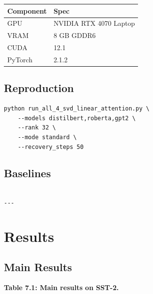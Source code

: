 \begin{table}[H]
\centering
\small
\begin{tabular}{ll}
\toprule
\textbf{Component} & \textbf{Spec} \\
\midrule
GPU & NVIDIA RTX 4070 Laptop \\
VRAM & 8 GB GDDR6 \\
CUDA & 12.1 \\
PyTorch & 2.1.2 \\
\bottomrule
\end{tabular}
\end{table}

\subsection{Reproduction}

\begin{lstlisting}
python run_all_4_svd_linear_attention.py \
    --models distilbert,roberta,gpt2 \
    --rank 32 \
    --mode standard \
    --recovery_steps 50
\end{lstlisting}

\subsection{Baselines}

\begin{lstlisting}

---
\end{lstlisting}


\section{Results}

\subsection{Main Results}

\textbf{Table 7.1: Main results on SST-2.}

